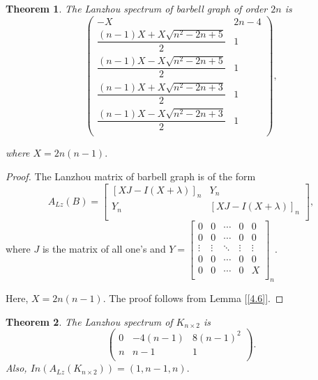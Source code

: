 \documentclass[10pt,a4paper,oneside]{article}
\newtheorem{theorem}{Theorem}
\begin{document}
\begin{theorem}
The Lanzhou spectrum of barbell graph of order $2n$ is 
$$\begin{pmatrix}
-X & 2n-4\\
\dfrac{(n-1)X+X\sqrt{n^2-2n+5}}{2} &1\\
\dfrac{(n-1)X-X\sqrt{n^2-2n+5}}{2} & 1\\
\dfrac{(n-1)X+X\sqrt{n^2-2n+3}}{2} & 1\\
\dfrac{(n-1)X-X\sqrt{n^2-2n+3}}{2} & 1\\
\end{pmatrix},$$
	
	where $X=2n(n-1).$
\end{theorem}
\begin{proof}
	The Lanzhou matrix of barbell graph is of the form $$A_{Lz}(B)=\begin{bmatrix}
		[XJ-I(X+\lambda)]_{n} &Y_{n}\\
		Y_{n} & [XJ-I(X+\lambda)]_{n}\\
	\end{bmatrix},$$ where $J$ is the matrix of all one's and $Y=\begin{bmatrix}
		0&0&\cdots&0&0\\
		0&0&\cdots&0&0\\
		\vdots&\vdots&\ddots&\vdots&\vdots\\
		0&0&\cdots&0&0\\
		0&0&\cdots&0&X\\
	\end{bmatrix}_{n}.$ 
	
	
	Here, $X=2n(n-1).$ The proof follows from Lemma [\ref{4.6}].
\end{proof}
\begin{theorem}
The Lanzhou spectrum of $K_{n\times 2}$ is  $$\begin{pmatrix}
0& -4(n-1) & 8(n-1)^2 \\
n & n-1 & 1\\
\end{pmatrix}.$$ 
Also, $In(A_{Lz}(K_{n\times 2}))=(1,n-1,n).$
\end{theorem}
\end{document}
